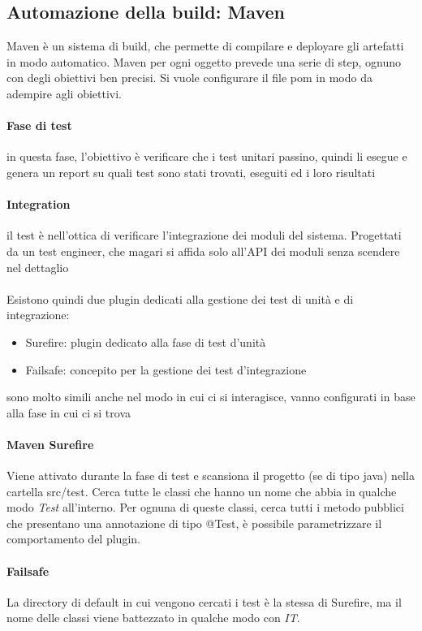 \documentclass{article}
\begin{document}
\subsection{Automazione della build: Maven}
Maven è un sistema di build, che permette di compilare e deployare gli artefatti in modo automatico. Maven per ogni oggetto prevede una serie di step, ognuno con degli obiettivi ben precisi. Si vuole configurare il file pom in modo da adempire agli obiettivi.
\paragraph{Fase di test}in questa fase, l'obiettivo è verificare che i test unitari passino, quindi li esegue e genera un report su quali test sono stati trovati, eseguiti ed i loro risultati
\paragraph{Integration}il test è nell'ottica di verificare l'integrazione dei moduli del sistema. Progettati da un test engineer, che magari si affida solo all'API dei moduli senza scendere nel dettaglio\\\\ Esistono quindi due plugin dedicati alla gestione dei test di unità e di integrazione:
\begin{itemize}
\item Surefire: plugin dedicato alla fase di test d'unità
\item Failsafe: concepito per la gestione dei test d'integrazione
\end{itemize}
sono molto simili anche nel modo in cui ci si interagisce, vanno configurati in base alla fase in cui ci si trova
\paragraph{Maven Surefire}
Viene attivato durante la fase di test e scansiona il progetto (se di tipo java) nella cartella src/test. Cerca tutte le classi che hanno un nome che abbia in qualche modo \textit{Test} all'interno. Per ognuna di queste classi, cerca tutti i metodo pubblici che presentano una annotazione di tipo @Test, è possibile parametrizzare il comportamento del plugin.
\paragraph{Failsafe}
La directory di default in cui vengono cercati i test è la stessa di Surefire, ma il nome delle classi viene battezzato in qualche modo con \textit{IT}.
\end{document}
